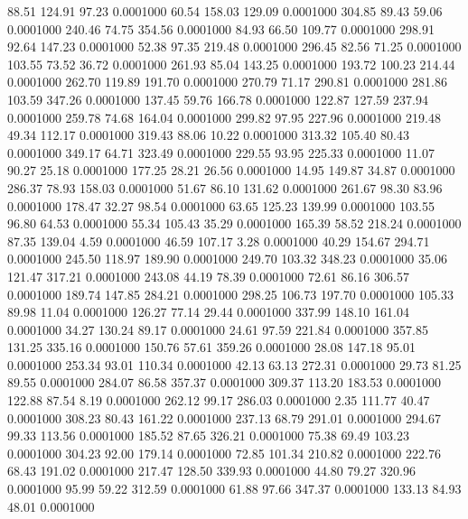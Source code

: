   88.51  124.91   97.23   0.0001000
  60.54  158.03  129.09   0.0001000
 304.85   89.43   59.06   0.0001000
 240.46   74.75  354.56   0.0001000
  84.93   66.50  109.77   0.0001000
 298.91   92.64  147.23   0.0001000
  52.38   97.35  219.48   0.0001000
 296.45   82.56   71.25   0.0001000
 103.55   73.52   36.72   0.0001000
 261.93   85.04  143.25   0.0001000
 193.72  100.23  214.44   0.0001000
 262.70  119.89  191.70   0.0001000
 270.79   71.17  290.81   0.0001000
 281.86  103.59  347.26   0.0001000
 137.45   59.76  166.78   0.0001000
 122.87  127.59  237.94   0.0001000
 259.78   74.68  164.04   0.0001000
 299.82   97.95  227.96   0.0001000
 219.48   49.34  112.17   0.0001000
 319.43   88.06   10.22   0.0001000
 313.32  105.40   80.43   0.0001000
 349.17   64.71  323.49   0.0001000
 229.55   93.95  225.33   0.0001000
  11.07   90.27   25.18   0.0001000
 177.25   28.21   26.56   0.0001000
  14.95  149.87   34.87   0.0001000
 286.37   78.93  158.03   0.0001000
  51.67   86.10  131.62   0.0001000
 261.67   98.30   83.96   0.0001000
 178.47   32.27   98.54   0.0001000
  63.65  125.23  139.99   0.0001000
 103.55   96.80   64.53   0.0001000
  55.34  105.43   35.29   0.0001000
 165.39   58.52  218.24   0.0001000
  87.35  139.04    4.59   0.0001000
  46.59  107.17    3.28   0.0001000
  40.29  154.67  294.71   0.0001000
 245.50  118.97  189.90   0.0001000
 249.70  103.32  348.23   0.0001000
  35.06  121.47  317.21   0.0001000
 243.08   44.19   78.39   0.0001000
  72.61   86.16  306.57   0.0001000
 189.74  147.85  284.21   0.0001000
 298.25  106.73  197.70   0.0001000
 105.33   89.98   11.04   0.0001000
 126.27   77.14   29.44   0.0001000
 337.99  148.10  161.04   0.0001000
  34.27  130.24   89.17   0.0001000
  24.61   97.59  221.84   0.0001000
 357.85  131.25  335.16   0.0001000
 150.76   57.61  359.26   0.0001000
  28.08  147.18   95.01   0.0001000
 253.34   93.01  110.34   0.0001000
  42.13   63.13  272.31   0.0001000
  29.73   81.25   89.55   0.0001000
 284.07   86.58  357.37   0.0001000
 309.37  113.20  183.53   0.0001000
 122.88   87.54    8.19   0.0001000
 262.12   99.17  286.03   0.0001000
   2.35  111.77   40.47   0.0001000
 308.23   80.43  161.22   0.0001000
 237.13   68.79  291.01   0.0001000
 294.67   99.33  113.56   0.0001000
 185.52   87.65  326.21   0.0001000
  75.38   69.49  103.23   0.0001000
 304.23   92.00  179.14   0.0001000
  72.85  101.34  210.82   0.0001000
 222.76   68.43  191.02   0.0001000
 217.47  128.50  339.93   0.0001000
  44.80   79.27  320.96   0.0001000
  95.99   59.22  312.59   0.0001000
  61.88   97.66  347.37   0.0001000
 133.13   84.93   48.01   0.0001000
